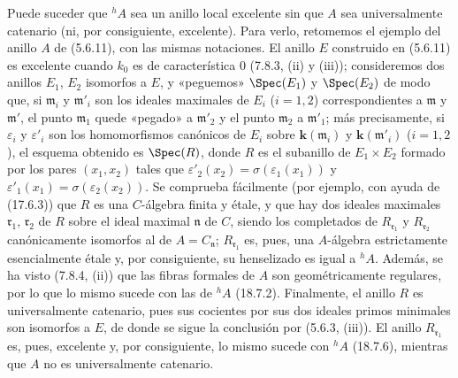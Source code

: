 \begin{remark}[18.7.7]
\label{IV.18.7.7}
Puede suceder que ${}^h\!A$ sea un anillo local excelente sin que $A$ sea universalmente catenario (ni, por consiguiente, excelente). Para verlo, retomemos el ejemplo del anillo $A$ de (5.6.11), con las mismas notaciones. El anillo $E$ construido en (5.6.11) es excelente cuando $k_0$ es de característica $0$ (7.8.3, (ii) y (iii)); consideremos dos anillos $E_1$, $E_2$ isomorfos a $E$, y «peguemos» $\Spec(E_1)$ y $\Spec(E_2)$ de modo que, si $\mathfrak m_i$ y $\mathfrak m'_i$ son los ideales maximales de $E_i$ ($i=1,2$) correspondientes a $\mathfrak m$ y $\mathfrak m'$, el punto $\mathfrak m_1$ quede «pegado» a $\mathfrak m'_2$ y el punto $\mathfrak m_2$ a $\mathfrak m'_1$; más precisamente, si $\varepsilon_i$ y $\varepsilon'_i$ son los homomorfismos canónicos de $E_i$ sobre $\boldsymbol k(\mathfrak m_i)$ y $\boldsymbol k(\mathfrak m'_i)$ ($i=1,2$), el esquema obtenido es $\Spec(R)$, donde $R$ es el subanillo de $E_1\times E_2$ formado por los pares $(x_1,x_2)$ tales que $\varepsilon'_2(x_2)=\sigma(\varepsilon_1(x_1))$ y $\varepsilon'_1(x_1)=\sigma(\varepsilon_2(x_2))$. Se comprueba fácilmente (por ejemplo, con ayuda de (17.6.3)) que $R$ es una $C$-álgebra finita y étale, y que hay dos ideales maximales $\mathfrak r_1$, $\mathfrak r_2$ de $R$ sobre el ideal maximal $\mathfrak n$ de $C$, siendo los completados de $R_{\mathfrak r_1}$ y $R_{\mathfrak r_2}$ canónicamente isomorfos al de $A=C_{\mathfrak n}$; $R_{\mathfrak r_1}$ es, pues, una $A$-álgebra estrictamente esencialmente étale y, por consiguiente, su henselizado es igual a ${}^h\!A$. Además, se ha visto (7.8.4, (ii)) que las fibras formales de $A$ son geométricamente regulares, por lo que lo mismo sucede con las de ${}^h\!A$ (18.7.2). Finalmente, el anillo $R$ es universalmente catenario, pues sus cocientes por sus dos ideales primos minimales son isomorfos a $E$, de donde se sigue la conclusión por (5.6.3, (iii)). El anillo $R_{\mathfrak r_1}$ es, pues, excelente y, por consiguiente, lo mismo sucede con ${}^h\!A$ (18.7.6), mientras que $A$ no es universalmente catenario.
\end{remark}
